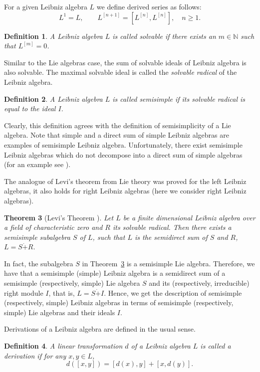 \documentclass[12pt,reqno]{amsart}
\newtheorem{thm}{Theorem}[section]
\newtheorem{defn}[thm]{Definition}
\numberwithin{equation}{section}
\begin{document}
For a given Leibniz algebra $L$ we define derived series as follows:
\[
L^1=L,\qquad L^{[n+1]}=[L^{[n]},L^{[n]}], \quad n \geq 1.
\]

\begin{defn} A Leibniz algebra $L$ is called
solvable if there exists an  $m\in\mathbb N$ such that $L^{[m]}=0$.
\end{defn}

Similar to the Lie algebras case, the sum of solvable ideals of Leibniz algebra is also solvable. The maximal solvable ideal is called the \emph{solvable radical} of the Leibniz algebra.

\begin{defn} A Leibniz algebra $L$ is called semisimple if its solvable radical is equal to the ideal $I$.
\end{defn}

Clearly, this definition  agrees with the definition of semisimplicity of a Lie algebra. Note that simple and a direct sum of simple Leibniz algebras
 are examples of semisimple Leibniz algebra. Unfortunately, there exist semisimple Leibniz algebras which do not decompose
  into a direct sum of simple algebras (for an example see \cite{GKO}).

The analogue of Levi's theorem from Lie theory was proved for the left Leibniz algebras, it  also holds for right Leibniz algebras (here we consider right Leibniz algebras).

\begin{thm}[Levi's Theorem \cite{Bar4}] \label{thmBarnes}
Let $L$ be a finite dimensional Leibniz algebra over a field of
characteristic zero and $R$  its solvable radical. Then there
exists a semisimple subalgebra $S$ of $L$, such that $L$ is the semidirect sum of  $S$ and $R$,
$L=S\dot{+}R$.
\end{thm}

In fact, the subalgebra $S$ in Theorem~\ref{thmBarnes} is a semisimple Lie algebra. Therefore, we have that a semisimple (simple) Leibniz algebra
is a semidirect sum of a semisimple (respectively, simple) Lie algebra $S$ and its (respectively, irreducible) right module $I$, that is, $L=S\dot{+}I$.
 Hence, we get the description of semisimple (respectively, simple) Leibniz algebras in terms of semisimple (respectively, simple) Lie algebras and their ideals $I$.

Derivations of a Leibniz algebra are defined in the usual sense.
\begin{defn}
A linear transformation $d$ of a Leibniz algebra $L$ is called a
derivation if for any $x, y\in L$,
\[d([x,y])=[d(x),y]+[x, d(y)].\]
\end{defn}
\smallskip
\end{document}
